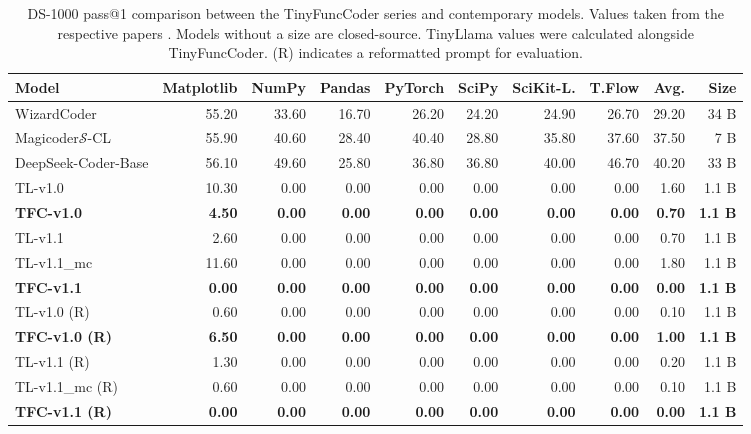 \begin{table}[!h]
    \centering
    \caption{DS-1000 pass@1 comparison between the TinyFuncCoder series and contemporary models. Values taken from the respective papers \cite{Wei.2024,Luo.2024,Guo.2024}. Models without a size are closed-source. TinyLlama values were calculated alongside TinyFuncCoder. (R) indicates a reformatted prompt for evaluation.}
    \scriptsize
    \begin{tabular}{l|rrrrrrrr|r}
        \hline
        Model & Matplotlib & NumPy & Pandas & PyTorch & SciPy & SciKit-L. & T.Flow & Avg. & Size \\
        \hline
        WizardCoder & 55.20 & 33.60 & 16.70 & 26.20 & 24.20 & 24.90 & 26.70 & 29.20 & 34 B \\
        Magicoder$\mathcal{S}$-CL & 55.90 & 40.60 & 28.40 & 40.40 & 28.80 & 35.80 & 37.60 & 37.50 & 7 B \\
        DeepSeek-Coder-Base & 56.10 & 49.60 & 25.80 & 36.80 & 36.80 & 40.00 & 46.70 & 40.20 & 33 B \\
        \hline
        TL-v1.0 & 10.30 & 0.00 & 0.00 & 0.00 & 0.00 & 0.00 & 0.00 & 1.60 & 1.1 B \\
        \textbf{TFC-v1.0} & \textbf{4.50} & \textbf{0.00} & \textbf{0.00} & \textbf{0.00} & \textbf{0.00} & \textbf{0.00} & \textbf{0.00} & \textbf{0.70} & \textbf{1.1 B} \\
        TL-v1.1 & 2.60 & 0.00 & 0.00 & 0.00 & 0.00 & 0.00 & 0.00 & 0.70 & 1.1 B \\
        TL-v1.1\_mc & 11.60 & 0.00 & 0.00 & 0.00 & 0.00 & 0.00 & 0.00 & 1.80 & 1.1 B \\
        \textbf{TFC-v1.1} & \textbf{0.00} & \textbf{0.00} & \textbf{0.00} & \textbf{0.00} & \textbf{0.00} & \textbf{0.00} & \textbf{0.00} & \textbf{0.00} & \textbf{1.1 B} \\
        \hline
        TL-v1.0 (R) & 0.60 & 0.00 & 0.00 & 0.00 & 0.00 & 0.00 & 0.00 & 0.10 & 1.1 B \\
        \textbf{TFC-v1.0 (R)} & \textbf{6.50} & \textbf{0.00} & \textbf{0.00} & \textbf{0.00} & \textbf{0.00} & \textbf{0.00} & \textbf{0.00} & \textbf{1.00} & \textbf{1.1 B} \\
        TL-v1.1 (R) & 1.30 & 0.00 & 0.00 & 0.00 & 0.00 & 0.00 & 0.00 & 0.20 & 1.1 B \\
        TL-v1.1\_mc (R) & 0.60 & 0.00 & 0.00 & 0.00 & 0.00 & 0.00 & 0.00 & 0.10 & 1.1 B \\
        \textbf{TFC-v1.1 (R)} & \textbf{0.00} & \textbf{0.00} & \textbf{0.00} & \textbf{0.00} & \textbf{0.00} & \textbf{0.00} & \textbf{0.00} & \textbf{0.00} & \textbf{1.1 B} \\
        \hline
    \end{tabular}
    \label{tab:ds1000}
\end{table}



